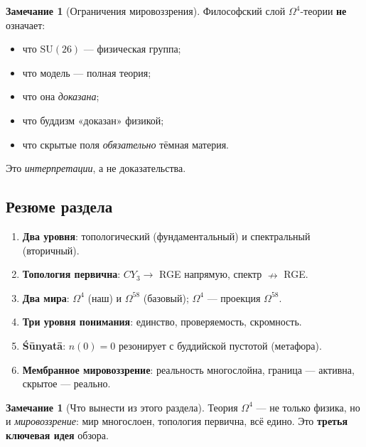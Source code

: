 \documentclass[11pt,a4paper]{article}
\newcommand{\SU}{\mathrm{SU}}
\newcommand{\CY}{CY_3}
\newcommand{\Om}{\Omega^4}
\newcommand{\Omfi}{\Omega^{58}}
\theoremstyle{definition}
\newtheorem{remark}[theorem]{Замечание}
\begin{document}
\begin{remark}[Ограничения мировоззрения]
\label{rem:worldview-limits}
Философский слой $\Om$-теории \textbf{не} означает:
\begin{itemize}
    \item что $\SU(26)$ — физическая группа;
    \item что модель — полная теория;
    \item что она \emph{доказана};
    \item что буддизм «доказан» физикой;
    \item что скрытые поля \emph{обязательно} тёмная материя.
\end{itemize}
Это \emph{интерпретации}, а не доказательства.
\end{remark}

\subsection{Резюме раздела}
\label{subsec:philosophy-summary}

\begin{enumerate}
    \item \textbf{Два уровня}: топологический (фундаментальный) 
          и спектральный (вторичный).
    \item \textbf{Топология первична}: $\CY \to$ RGE напрямую, 
          спектр $\nrightarrow$ RGE.
    \item \textbf{Два мира}: $\Om$ (наш) и $\Omfi$ (базовый); 
          $\Om$ — проекция $\Omfi$.
    \item \textbf{Три уровня понимания}: единство, 
          проверяемость, скромность.
    \item \textbf{Śūnyatā}: $n(0) = 0$ резонирует с буддийской 
          пустотой (метафора).
    \item \textbf{Мембранное мировоззрение}: реальность 
          многослойна, граница — активна, скрытое — реально.
\end{enumerate}

\begin{remark}[Что вынести из этого раздела]
\label{rem:philosophy-takeaway}
Теория $\Om$ — не только физика, но и \emph{мировоззрение}: 
мир многослоен, топология первична, всё едино. 
Это \textbf{третья ключевая идея} обзора.
\end{remark}
\end{document}
